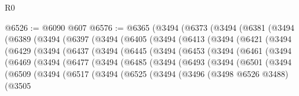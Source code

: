 \begin{lexlean}{R0}
\begin{coremodule}
@6526 := @6090 @607
@6576 := @6365
    (@3494
      (@6373
        (@3494
          (@6381
            (@3494
              (@6389
                (@3494
                  (@6397
                    (@3494
                      (@6405
                        (@3494
                          (@6413
                            (@3494
                              (@6421
                                (@3494
                                  (@6429
                                    (@3494
                                      (@6437
                                        (@3494
                                          (@6445
                                            (@3494
                                              (@6453
                                                (@3494
                                                  (@6461
                                                    (@3494
                                                      (@6469
                                                        (@3494
                                                          (@6477
                                                            (@3494
                                                              (@6485
                                                                (@3494
                                                                  (@6493
                                                                    (@3494
                                                                      (@6501
                                                                        (@3494
                                                                          (@6509
                                                                            (@3494
                                                                              (@6517
                                                                                (@3494
                                                                                  (@6525
                                                                                    (@3494
                                                                                      (@3496
                                                                                        (@3498
                                                                                          @6526
                                                                                          @3488)
                                                                                        (@3505

\end{coremodule}
\end{lexlean}
